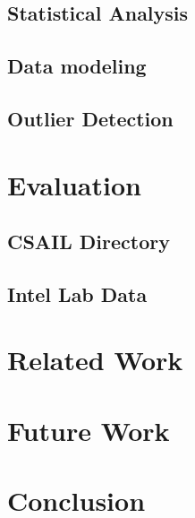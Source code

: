 \documentclass{vldb}
\begin{document}
\subsection{Statistical Analysis}
\label{sec:stat_anal}

\subsection{Data modeling}
\label{sec:model_creation}

\subsection{Outlier Detection}
\label{sec:outlier_detection}


\section{Evaluation}
\label{sec:eval}

\subsection{CSAIL Directory}
\label{sec:csail}


\subsection{Intel Lab Data}
\label{sec:intel}


%

%

\section{Related Work}
\label{sec:related_work}


\section{Future Work}
\label{sec:future}



\section{Conclusion}
\label{sec:concl}

\end{document}
